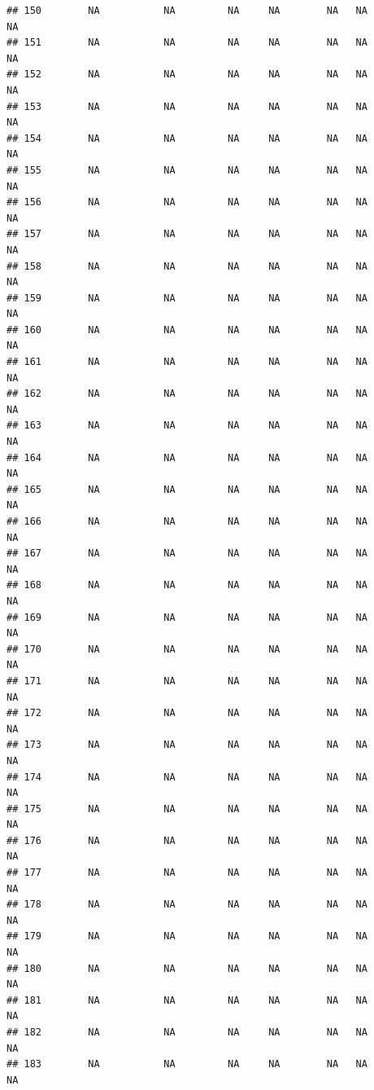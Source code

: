 \documentclass[
]{article}
\begin{document}
\begin{verbatim}
## 150        NA           NA         NA     NA        NA   NA             NA
## 151        NA           NA         NA     NA        NA   NA             NA
## 152        NA           NA         NA     NA        NA   NA             NA
## 153        NA           NA         NA     NA        NA   NA             NA
## 154        NA           NA         NA     NA        NA   NA             NA
## 155        NA           NA         NA     NA        NA   NA             NA
## 156        NA           NA         NA     NA        NA   NA             NA
## 157        NA           NA         NA     NA        NA   NA             NA
## 158        NA           NA         NA     NA        NA   NA             NA
## 159        NA           NA         NA     NA        NA   NA             NA
## 160        NA           NA         NA     NA        NA   NA             NA
## 161        NA           NA         NA     NA        NA   NA             NA
## 162        NA           NA         NA     NA        NA   NA             NA
## 163        NA           NA         NA     NA        NA   NA             NA
## 164        NA           NA         NA     NA        NA   NA             NA
## 165        NA           NA         NA     NA        NA   NA             NA
## 166        NA           NA         NA     NA        NA   NA             NA
## 167        NA           NA         NA     NA        NA   NA             NA
## 168        NA           NA         NA     NA        NA   NA             NA
## 169        NA           NA         NA     NA        NA   NA             NA
## 170        NA           NA         NA     NA        NA   NA             NA
## 171        NA           NA         NA     NA        NA   NA             NA
## 172        NA           NA         NA     NA        NA   NA             NA
## 173        NA           NA         NA     NA        NA   NA             NA
## 174        NA           NA         NA     NA        NA   NA             NA
## 175        NA           NA         NA     NA        NA   NA             NA
## 176        NA           NA         NA     NA        NA   NA             NA
## 177        NA           NA         NA     NA        NA   NA             NA
## 178        NA           NA         NA     NA        NA   NA             NA
## 179        NA           NA         NA     NA        NA   NA             NA
## 180        NA           NA         NA     NA        NA   NA             NA
## 181        NA           NA         NA     NA        NA   NA             NA
## 182        NA           NA         NA     NA        NA   NA             NA
## 183        NA           NA         NA     NA        NA   NA             NA

\end{verbatim}
\end{document}
